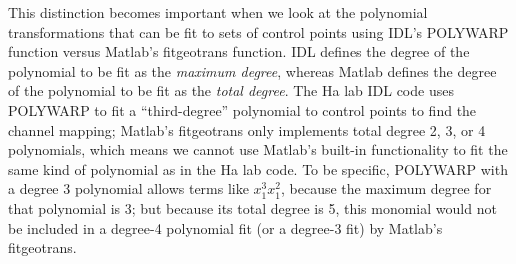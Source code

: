 \documentclass[11pt]{article}
\begin{document}
This distinction becomes important when we look at the polynomial transformations that can be fit to sets of control points using IDL's POLYWARP function versus Matlab's fitgeotrans function.  IDL defines the degree of the polynomial to be fit as the {\it maximum degree}, whereas Matlab defines the degree of the polynomial to be fit as the {\it total degree}.  The Ha lab IDL code uses POLYWARP to fit a ``third-degree'' polynomial to control points to find the channel mapping; Matlab's fitgeotrans only implements total degree 2, 3, or 4 polynomials, which means we cannot use Matlab's built-in functionality to fit the same kind of polynomial as in the Ha lab code.  To be specific, POLYWARP with a degree 3 polynomial allows terms like $x_1^3x_1^2$, because the maximum degree for that polynomial is 3; but because its total degree is 5, this monomial would not be included in a degree-4 polynomial fit (or a degree-3 fit) by Matlab's fitgeotrans.
\end{document}
